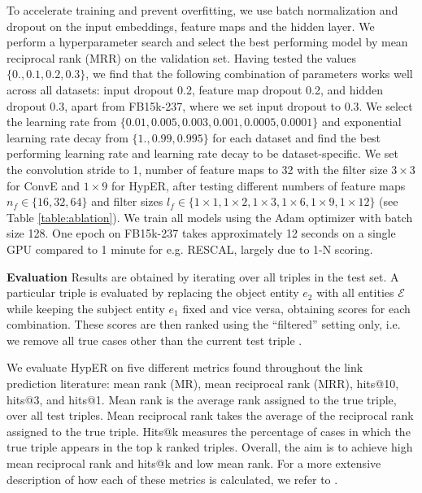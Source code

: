 \documentclass[runningheads]{llncs}
\newcommand{\keypoint}[1]{\vspace{0.1cm}\noindent\textbf{#1}\quad}
\begin{document}
To accelerate training and prevent overfitting, we use batch normalization \cite{ioffe2015batch} and dropout \cite{srivastava2014dropout} on the input embeddings, feature maps and the hidden layer. We perform a hyperparameter search and select the best performing model by mean reciprocal rank (MRR) on the validation set. Having tested the values $\{0., 0.1, 0.2, 0.3\}$, we find that the following combination of parameters works well across all datasets: input dropout 0.2, feature map dropout 0.2, and hidden dropout 0.3, apart from FB15k-237, where we set input dropout to 0.3. We select the learning rate from $\{0.01, 0.005, 0.003, 0.001, 0.0005, 0.0001\}$ and exponential learning rate decay from $\{1., 0.99, 0.995\}$ for each dataset and find the best performing learning rate and learning rate decay to be dataset-specific. We set the convolution stride to 1, number of feature maps to 32 with the filter size $3\times3$ for ConvE and $1 \times 9$ for HypER, after testing different numbers of feature maps $ n_f \in \{16, 32, 64\}$ and filter sizes $l_f \in \{1\times1, 1\times2, 1\times3, 1\times6, 1\times9, 1\times12\}$ (see Table \ref{table:ablation}). We train all models using the Adam optimizer with batch size 128. One epoch on FB15k-237 takes approximately 12 seconds on a single GPU compared to 1 minute for e.g. RESCAL, largely due to 1-N scoring. 

\keypoint{Evaluation} Results are obtained by iterating over all triples in the test set. A particular triple is evaluated by replacing the object entity $e_2$ with all entities $\mathcal{E}$ while keeping the subject entity $e_1$ fixed and vice versa, obtaining scores for each combination. These scores are then ranked using the ``filtered'' setting only, i.e. we remove all true cases other than the current test triple \cite{bordes2013translating}.  

We evaluate HypER on five different metrics found throughout the link prediction literature: mean rank (MR), mean reciprocal rank (MRR), hits@10, hits@3, and hits@1. Mean rank is the average rank assigned to the true triple, over all test triples. Mean reciprocal rank takes the average of the reciprocal rank assigned to the true triple. Hits@k measures the percentage of cases in which the true triple appears in the top k ranked triples. Overall, the aim is to achieve high mean reciprocal rank and hits@k and low mean rank. For a more extensive description of how each of these metrics is calculated, we refer to \cite{dettmers2017convolutional}.
\end{document}
